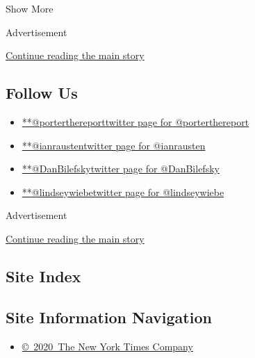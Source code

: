Show More

Advertisement

\protect\hyperlink{after-mid1}{Continue reading the main story}

\hypertarget{follow-us}{%
\subsection{Follow Us}\label{follow-us}}

\begin{itemize}
\tightlist
\item
  \href{https://twitter.com/porterthereport}{**@porterthereporttwitter
  page for @porterthereport}
\item
  \href{https://twitter.com/ianrausten}{**@ianraustentwitter page for
  @ianrausten}
\item
  \href{https://twitter.com/DanBilefsky}{**@DanBilefskytwitter page for
  @DanBilefsky}
\item
  \href{https://twitter.com/lindseywiebe}{**@lindseywiebetwitter page
  for @lindseywiebe}
\end{itemize}

Advertisement

\protect\hyperlink{after-mktg}{Continue reading the main story}

\hypertarget{site-index}{%
\subsection{Site Index}\label{site-index}}

\hypertarget{site-information-navigation}{%
\subsection{Site Information
Navigation}\label{site-information-navigation}}

\begin{itemize}
\tightlist
\item
  \href{https://help.nytimes.com/hc/en-us/articles/115014792127-Copyright-notice}{©~2020~The
  New York Times Company}
\end{itemize}

